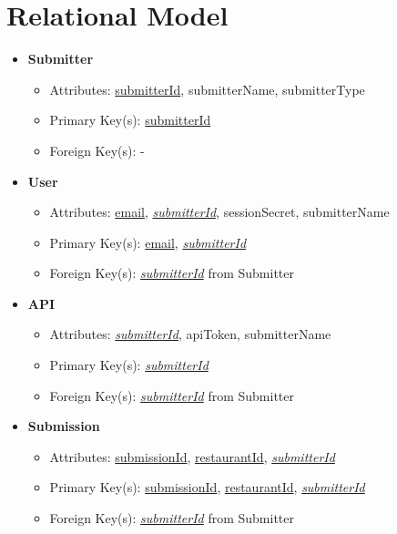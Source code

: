 \documentclass{article}
\begin{document}
\section{Relational Model}
    \begin{itemize}
        \item \textbf{Submitter}        
        \begin{itemize}
            \item Attributes: \underline{submitterId}, submitterName, submitterType
            \item Primary Key(s): \underline{submitterId}
            \item Foreign Key(s): -
        \end{itemize}

        \item \textbf{User}
        \begin{itemize}
            \item Attributes: \underline{email}, \underline{\textit{submitterId}}, sessionSecret, submitterName
            \item Primary Key(s): \underline{email}, \underline{\textit{submitterId}}
            \item Foreign Key(s): \underline{\textit{submitterId}} from Submitter
        \end{itemize}

        \item \textbf{API}
        \begin{itemize}
            \item Attributes: \underline{\textit{submitterId}}, apiToken, submitterName
            \item Primary Key(s): \underline{\textit{submitterId}}
            \item Foreign Key(s): \underline{\textit{submitterId}} from Submitter
        \end{itemize}

        \item \textbf{Submission}                
        \begin{itemize}
            \item Attributes: \underline{submissionId}, \underline{restaurantId}, \underline{\textit{submitterId}}
            \item Primary Key(s): \underline{submissionId}, \underline{restaurantId}, \underline{\textit{submitterId}}
            \item Foreign Key(s): \underline{\textit{submitterId}} from Submitter
        \end{itemize}


\end{itemize}
\end{document}
